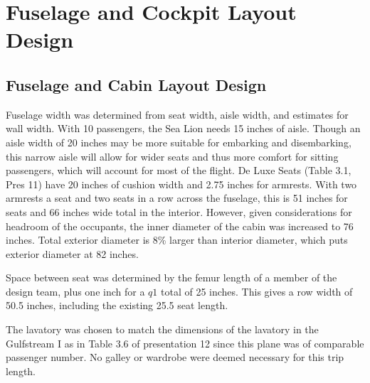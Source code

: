 \documentclass[conf]{new-aiaa}
\begin{document}
\section{Fuselage and Cockpit Layout Design}
\subsection{Fuselage and Cabin Layout Design}

Fuselage width was determined from seat width, aisle width, and estimates for wall width. With 10 passengers, the Sea Lion needs 15 inches of aisle. Though an aisle width of 20 inches may be more suitable for embarking and disembarking, this narrow aisle will allow for wider seats and thus more comfort for sitting passengers, which will account for most of the flight. De Luxe Seats (Table 3.1, Pres 11) have 20 inches of cushion width and 2.75 inches for armrests. With two armrests a seat and two seats in a row across the fuselage, this is 51 inches for seats and 66 inches wide total in the interior. However, given considerations for headroom of the occupants, the inner diameter of the cabin was increased to 76 inches. Total exterior diameter is 8\% larger than interior diameter, which puts exterior diameter at 82 inches.

Space between seat was determined by the femur length of a member of the design team, plus one inch for a $q1$ total of 25 inches. This gives a row width of 50.5 inches, including the existing 25.5 seat length.

The lavatory was chosen to match the dimensions of the lavatory in the Gulfstream I as in Table 3.6 of presentation 12 \cite{pres12} since this plane was of comparable passenger number. No galley or wardrobe were deemed necessary for this trip length.
\end{document}
